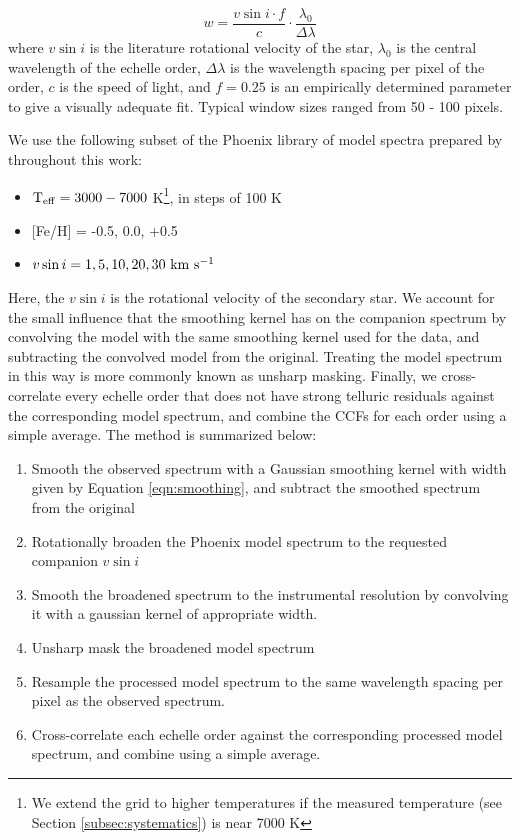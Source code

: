 \documentclass{emulateapj}
\begin{document}
\begin{equation}
w = \frac{v\sin{i} \cdot f}{c} \cdot \frac{\lambda_0}{\Delta \lambda}
\label{eqn:smoothing}
\end{equation}
where $v\sin{i}$ is the literature rotational velocity of the star, $\lambda_0$ is the central wavelength of the echelle order, $\Delta \lambda$ is the wavelength spacing per pixel of the order, $c$ is the speed of light, and $f = 0.25$ is an empirically determined parameter to give a visually adequate fit. Typical window sizes ranged from 50 - 100 pixels.

We use the following subset of the Phoenix library of model spectra prepared by \cite{Husser2013_b} throughout this work:

\begin{itemize}
\item $\rm T_{eff} = 3000-7000$ K\footnote{We extend the grid to higher temperatures if the measured temperature (see Section \ref{subsec:systematics}) is near 7000 K}, in steps of 100 K
\item {[}Fe/H{]} = -0.5, 0.0, +0.5
\item $v\sin{i} = 1, 5, 10, 20, 30 \ \rm km \ s^{-1}$
\end{itemize}
Here, the $v\sin{i}$ is the rotational velocity of the secondary star. We account for the small influence that the smoothing kernel has on the companion spectrum by convolving the model with the same smoothing kernel used for the data, and subtracting the convolved model from the original. Treating the model spectrum in this way is more commonly known as unsharp masking. Finally, we cross-correlate every echelle order that does not have strong telluric residuals against the corresponding model spectrum, and combine the CCFs for each order using a simple average. The method is summarized below:

\begin{enumerate}
 \item Smooth the observed spectrum with a Gaussian smoothing kernel with width given by Equation \ref{eqn:smoothing}, and subtract the smoothed spectrum from the original
 \item Rotationally broaden the Phoenix model spectrum to the requested companion $v\sin{i}$
 \item Smooth the broadened spectrum to the instrumental resolution by convolving it with a gaussian kernel of appropriate width.
 \item Unsharp mask the broadened model spectrum
 \item Resample the processed model spectrum to the same wavelength spacing per pixel as the observed spectrum.
 \item Cross-correlate each echelle order against the corresponding processed model spectrum, and combine using a simple average.
\end{enumerate}
\end{document}
